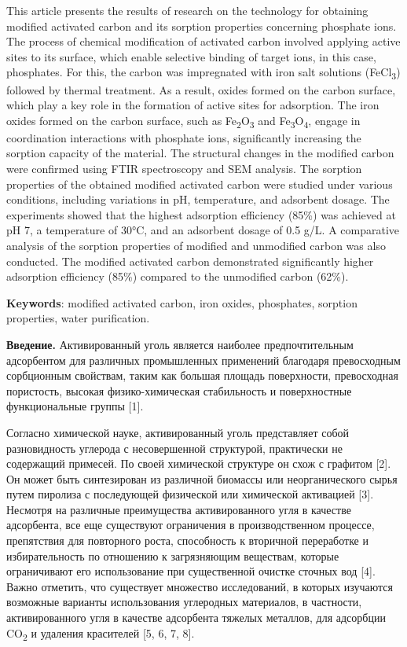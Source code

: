 This article presents the results of research on the technology for
obtaining modified activated carbon and its sorption properties
concerning phosphate ions. The process of chemical modification of
activated carbon involved applying active sites to its surface, which
enable selective binding of target ions, in this case, phosphates. For
this, the carbon was impregnated with iron salt solutions
(FeCl\textsubscript{3}) followed by thermal treatment. As a result,
oxides formed on the carbon surface, which play a key role in the
formation of active sites for adsorption. The iron oxides formed on the
carbon surface, such as Fe\textsubscript{2}O\textsubscript{3} and
Fe\textsubscript{3}O\textsubscript{4}, engage in coordination
interactions with phosphate ions, significantly increasing the sorption
capacity of the material. The structural changes in the modified carbon
were confirmed using FTIR spectroscopy and SEM analysis. The sorption
properties of the obtained modified activated carbon were studied under
various conditions, including variations in pH, temperature, and
adsorbent dosage. The experiments showed that the highest adsorption
efficiency (85\%) was achieved at pH 7, a temperature of 30°C, and an
adsorbent dosage of 0.5 g/L. A comparative analysis of the sorption
properties of modified and unmodified carbon was also conducted. The
modified activated carbon demonstrated significantly higher adsorption
efficiency (85\%) compared to the unmodified carbon (62\%).

{\bfseries Keywords}: modified activated carbon, iron oxides, phosphates,
sorption properties, water purification.

{\bfseries Введение.} Активированный уголь является наиболее
предпочтительным адсорбентом для различных промышленных применений
благодаря превосходным сорбционным свойствам, таким как большая площадь
поверхности, превосходная пористость, высокая физико-химическая
стабильность и поверхностные функциональные группы {[}1{]}.

Согласно химической науке, активированный уголь представляет собой
разновидность углерода с несовершенной структурой, практически не
содержащий примесей. По своей химической структуре он схож с графитом
{[}2{]}. Он может быть синтезирован из различной биомассы или
неорганического сырья путем пиролиза с последующей физической или
химической активацией {[}3{]}. Несмотря на различные преимущества
активированного угля в качестве адсорбента, все еще существуют
ограничения в производственном процессе, препятствия для повторного
роста, способность к вторичной переработке и избирательность по
отношению к загрязняющим веществам, которые ограничивают его
использование при существенной очистке сточных вод {[}4{]}. Важно
отметить, что существует множество исследований, в которых изучаются
возможные варианты использования углеродных материалов, в частности,
активированного угля в качестве адсорбента тяжелых металлов, для
адсорбции CO\textsubscript{2} и удаления красителей {[}5, 6, 7, 8{]}.

